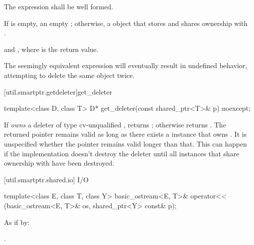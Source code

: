 \begin{itemdescr}
\pnum\requires  The expression  shall
be well formed.

\pnum\returns  If  is empty, an empty ; otherwise, a
 object that stores  and shares
ownership with .

\pnum
\postconditions {} and
, where  is the return value.

\pnum \enternote The seemingly equivalent expression
 will eventually result in
undefined behavior, attempting to delete the same object twice. \exitnote
\end{itemdescr}

[util.smartptr.getdeleter]{get_deleter}

%
%
\begin{itemdecl}
template<class D, class T> D* get_deleter(const shared_ptr<T>& p) noexcept;
\end{itemdecl}

\begin{itemdescr}
\pnum\returns  If  \textit{owns} a deleter  of type cv-unqualified
, returns ; otherwise returns .
The returned
pointer remains valid as long as there exists a  instance
that owns . \enternote It is unspecified whether the pointer
remains valid longer than that. This can happen if the implementation doesn't destroy
the deleter until all  instances that share ownership with
 have been destroyed. \exitnote
\end{itemdescr}

[util.smartptr.shared.io]{ I/O}

%
%
\begin{itemdecl}
template<class E, class T, class Y>
  basic_ostream<E, T>& operator<< (basic_ostream<E, T>& os, shared_ptr<Y> const& p);
\end{itemdecl}

\begin{itemdescr}
\pnum\effects As if by: 

\pnum\returns  {}.
\end{itemdescr}

